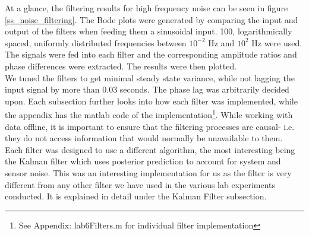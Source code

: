\documentclass{article}
\theoremstyle{plain}
\theoremstyle{definition}
\theoremstyle{remark}
\begin{document}
At a glance, the filtering results for high frequency noise can be seen in figure \ref{ss_noise_filtering}. The Bode plots were generated by comparing the input and output of the filters when feeding them a sinusoidal input. 100, logarithmically spaced, uniformly distributed frequencies between $10^{-2}$ Hz and $10^2$ Hz were used. The signals were fed into each filter and the corresponding amplitude ratios and phase differences were extracted. The results were then plotted.\\

 We tuned the filters to get minimal steady state variance, while not lagging the input signal by more than 0.03 seconds. The phase lag was arbitrarily decided upon. Each subsection further looks into how each filter was implemented, while the appendix has the matlab code of the implementation\footnote{See Appendix: lab6Filters.m for individual filter implementation}. While working with data offline, it is important to ensure that the filtering processes are causal- i.e. they do not access information that would normally be unavailable to them.\\

Each filter was designed to use a different algorithm, the most interesting being the Kalman filter which uses posterior prediction to account for system and sensor noise. This was an interesting implementation for us as the filter is very different from any other filter we have used in the various lab experiments conducted. It is explained in detail under the Kalman Filter subsection.\\
\end{document}
